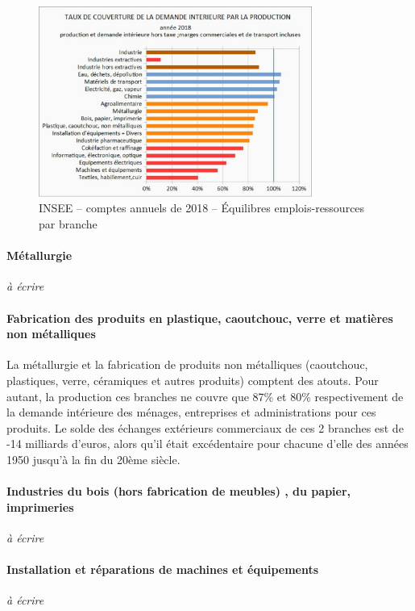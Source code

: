 \documentclass[a4paper]{article}
\begin{document}
\begin{figure}[H]
    \centering
    \includegraphics*[width=0.8\textwidth]{images/couverture}
    \caption{INSEE – comptes annuels de 2018 – Équilibres emplois-ressources par branche}
    \label{fig:couverture}
\end{figure}

\paragraph{Métallurgie}
\textit{à écrire}

\paragraph{Fabrication des produits en plastique, caoutchouc, verre et matières non métalliques}
La métallurgie et la fabrication de produits non métalliques (caoutchouc, plastiques, verre, céramiques et autres produits) comptent des atouts. Pour autant, la production ces branches ne couvre que 87\% et 80\% respectivement de la demande intérieure des ménages, entreprises et administrations pour ces produits. Le solde des échanges extérieurs commerciaux de ces 2 branches est de -14 milliards d'euros, alors qu’il était excédentaire pour chacune d’elle des années 1950 jusqu’à la fin du 20ème siècle.

\paragraph{Industries du bois (hors fabrication de meubles) , du papier, imprimeries}
\textit{à écrire}

\paragraph{Installation et réparations de machines et équipements}
\textit{à écrire}
\end{document}
